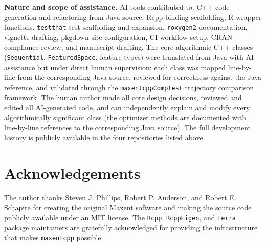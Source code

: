 \documentclass[10pt,letterpaper]{article}
\begin{document}
\textbf{Nature and scope of assistance.} AI tools contributed to: C++
code generation and refactoring from Java source, Rcpp binding
scaffolding, R wrapper functions, \texttt{testthat} test scaffolding and
expansion, \texttt{roxygen2} documentation, vignette drafting, pkgdown
site configuration, CI workflow setup, CRAN compliance review, and
manuscript drafting. The core algorithmic C++ classes
(\texttt{Sequential}, \texttt{FeaturedSpace}, feature types) were
translated from Java with AI assistance but under direct human
supervision: each class was mapped line-by-line from the corresponding
Java source, reviewed for correctness against the Java reference, and
validated through the \texttt{maxentcppCompTest} trajectory comparison
framework. The human author made all core design decisions, reviewed and
edited all AI-generated code, and can independently explain and modify
every algorithmically significant class (the optimizer methods are
documented with line-by-line references to the corresponding Java
source). The full development history is publicly available in the four
repositories listed above.

\section*{Acknowledgements}

The author thanks Steven J. Phillips, Robert P. Anderson, and Robert E.
Schapire for creating the original Maxent software and making the source
code publicly available under an MIT license. The \texttt{Rcpp},
\texttt{RcppEigen}, and \texttt{terra} package maintainers are
gratefully acknowledged for providing the infrastructure that makes
\texttt{maxentcpp} possible.

\nolinenumbers




\appendix

\end{document}
